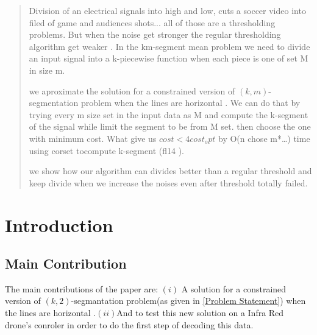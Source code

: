 \documentclass{vldb}
\begin{document}
\author{

\alignauthor Lawrence P. Leipuner\\
       \\
       \\
       \\
\alignauthor Sean Fogarty\\
       \\
       \\
       \\
}
\maketitle
\begin{abstract}
   
 Division of an electrical signals into high and low, cuts a soccer video into filed of game and audiences shots... all of those are a thresholding problems. But when the noise get stronger the regular thresholding algorithm get weaker . In the km-segment mean problem we need to divide an input signal into a k-piecewise function when each piece is one of set M in size m.

we aproximate the solution for a constrained version of $(k,m)$-segmentation problem when the lines are horizontal . We can do that by trying every m size set in the input data as M and compute the k-segment of the signal while limit the segment to be from M set. then choose the one with minimum cost. What give us $cost<4cost_opt$ by O(n chose m*…) time using corset tocompute k-segment (fl14 ).

we show how our algorithm can divides better than a regular threshold and keep divide when we increase the noises even after threshold totally failed.
\end{abstract}

\section{Introduction}
\subsection{Main Contribution}
The main contributions of the paper are: $(i)$ A solution for a constrained version of $(k,2)$-segmantation problem(as given in \ref{Problem Statement}) 
when the lines are horizontal .$(ii)$And to test this new solution on a Infra Red drone's conroler in order to do the first step of decoding this data.
\end{document}
